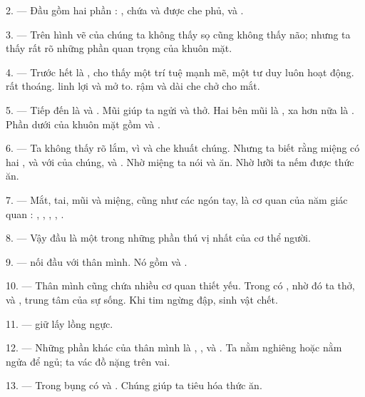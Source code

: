 2. --- Đầu gồm hai phần : , chứa  và được  che
phủ, và .

3. --- Trên hình vẽ của chúng ta không thấy sọ cũng không thấy não; nhưng ta thấy rất
rõ những phần quan trọng của khuôn mặt.

4. --- Trước hết là , cho thấy một trí tuệ mạnh mẽ, một tư duy luôn hoạt
động.  rất thoáng.  linh lợi và mở to.  rậm và  dài che chở cho mắt.

5. --- Tiếp đến là  và . Mũi giúp ta ngửi và thở. Hai bên
mũi là , xa hơn nữa là . Phần dưới của khuôn mặt gồm
 và .

6. --- Ta không thấy rõ lắm, vì  và  che khuất chúng.
Nhưng ta biết rằng miệng có hai ,  và 
với  của chúng, và . Nhờ miệng ta nói và ăn. Nhờ lưỡi ta nếm
được thức ăn.

7. --- Mắt, tai, mũi và miệng, cũng như các ngón tay, là cơ quan của năm giác quan :
, , , ,
.

8. --- Vậy đầu là một trong những phần thú vị nhất của cơ thể người.

\VUsaut{4.4mm}
\VUsaut{3.0mm}

9. ---  nối đầu với thân mình. Nó gồm  và .

10. --- Thân mình cũng chứa nhiều cơ quan thiết yếu. Trong  có
, nhờ đó ta thở, và , trung tâm của sự sống. Khi tim ngừng
đập, sinh vật chết.

11. ---  giữ lấy lồng ngực.

12. --- Những phần khác của thân mình là , ,  và
. Ta nằm nghiêng hoặc nằm ngửa để ngủ; ta vác đồ nặng trên vai.

13. --- Trong bụng có  và . Chúng giúp ta tiêu hóa thức ăn.

\VUsaut{4.4mm}
\VUsaut{3.0mm}


